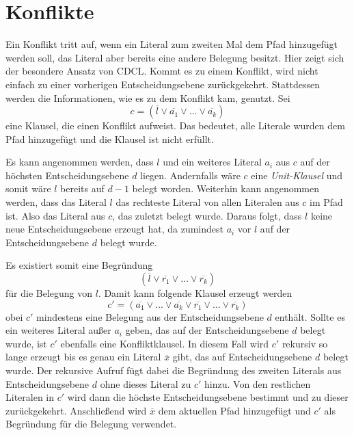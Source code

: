 \section{Konflikte}
Ein Konflikt tritt auf, wenn ein Literal zum zweiten Mal dem Pfad hinzugefügt werden soll, das Literal aber bereits eine andere Belegung besitzt.
Hier zeigt sich der besondere Ansatz von CDCL.
Kommt es zu einem Konflikt, wird nicht einfach zu einer vorherigen Entscheidungsebene zurückgekehrt. Stattdessen werden die Informationen, wie es zu dem Konflikt kam, genutzt.
Sei
\[
c = (\overline{l} \lor \overline{a_1} \lor \ldots \lor \overline{a_k})
\]
eine Klausel, die einen Konflikt aufweist. Das bedeutet, alle Literale wurden dem Pfad hinzugefügt und die Klausel ist nicht erfüllt.

Es kann angenommen werden, dass \(l\) und ein weiteres Literal \(a_i\) aus \(c\) auf der höchsten Entscheidungsebene \(d\) liegen.
Andernfalls wäre \(c\) eine \emph{Unit-Klausel} und somit wäre \(l\) bereits auf \(d-1\) belegt worden.
Weiterhin kann angenommen werden, dass das Literal \(l\) das rechteste Literal von allen Literalen aus \(c\) im Pfad ist. Also das Literal aus \(c\), das zuletzt belegt wurde.
Daraus folgt, dass \(l\) keine neue Entscheidungsebene erzeugt hat, da zumindest \(a_i\) vor \(l\) auf der Entscheidungsebene \(d\) belegt wurde.

Es existiert somit eine Begründung
\[
(\overline{l} \lor \overline{r_1} \lor \ldots \lor \overline{r_k})
\]
für die Belegung von \(l\).
Damit kann folgende Klausel erzeugt werden
\[
c' = (\overline{a_1} \lor \ldots \lor \overline{a_k} \lor \overline{r_1} \lor \ldots \lor \overline{r_k})
\]
obei \(c'\) mindestens eine Belegung aus der Entscheidungsebene \(d\) enthält.
Sollte es ein weiteres Literal außer \(a_i\) geben, das auf der Entscheidungsebene \(d\) belegt wurde, ist \(c'\) ebenfalls eine Konfliktklausel.
In diesem Fall wird \(c'\) rekursiv so lange erzeugt bis es genau ein Literal \(\overline{x}\) gibt, das auf Entscheidungsebene \(d\) belegt wurde.
Der rekursive Aufruf fügt dabei die Begründung des zweiten Literals aus Entscheidungsebene \(d\) ohne dieses Literal zu \(c'\) hinzu.
Von den restlichen Literalen in \(c'\) wird dann die höchste Entscheidungsebene bestimmt und zu dieser zurückgekehrt.
Anschließend wird \(\overline{x}\) dem aktuellen Pfad hinzugefügt und \(c'\) als Begründung für die Belegung verwendet.


